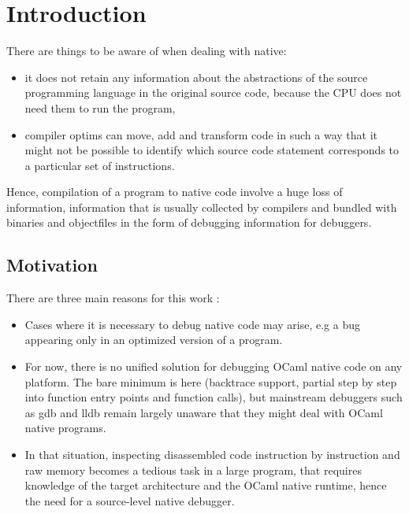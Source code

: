 \chapter{Introduction\label{cha:chapter1}}

There are things to be aware of when dealing with \gls{native}:
\begin{itemize}
    \item it does not retain any information about
        the abstractions of the source programming language in the original
        source code, because the CPU does not need them to run the program,
    \item compiler \glspl{optim} can move, add and transform code
        in such a way that it might not be possible to identify which
        source code statement corresponds to a particular set of instructions.
\end{itemize}

Hence, compilation of a program to native code involve a huge loss of information,
information that is usually collected by compilers and bundled with binaries and
\glspl{objectfile} in the form of debugging information for debuggers.

\section{Motivation\label{sec:moti}}

There are three main reasons for this work :

\begin{itemize}
    \item Cases where it is necessary to debug native code may arise, e.g a bug
        appearing only in an optimized version of a program.
    \item For now, there is no unified solution for debugging OCaml native
        code on any platform. The bare minimum is here (\gls{backtrace} support,
        partial step by step into function entry points and function calls),
        but mainstream debuggers such as gdb and lldb remain largely unaware that they
        might deal with OCaml native programs.
    \item In that situation, inspecting disassembled code instruction by
        instruction and raw memory becomes a tedious task in a large program,
        that requires knowledge of the target architecture and the OCaml native
        runtime, hence the need for a source-level native debugger.
\end{itemize}

